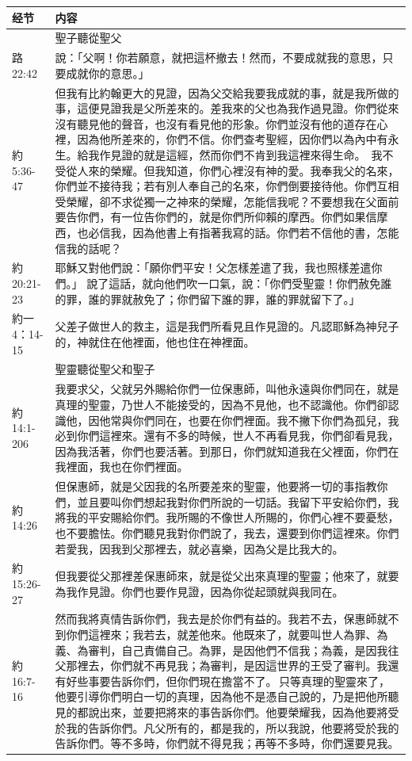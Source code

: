 \begin{table}[H]
\centering
\begin{tabular}{p{5.7em}p{43em}}  \toprule
经节&内容 \\  \midrule

&聖子聽從聖父\\  \midrule
路22:42&說：「父啊！你若願意，就把這杯撤去！然而，不要成就我的意思，只要成就你的意思。」\\  \midrule
約5:36-47&但我有比約翰更大的見證，因為父交給我要我成就的事，就是我所做的事，這便見證我是父所差來的。差我來的父也為我作過見證。你們從來沒有聽見他的聲音，也沒有看見他的形象。你們並沒有他的道存在心裡，因為他所差來的，你們不信。你們查考聖經，因你們以為內中有永生。給我作見證的就是這經，然而你們不肯到我這裡來得生命。  我不受從人來的榮耀。但我知道，你們心裡沒有神的愛。我奉我父的名來，你們並不接待我；若有別人奉自己的名來，你們倒要接待他。你們互相受榮耀，卻不求從獨一之神來的榮耀，怎能信我呢？不要想我在父面前要告你們，有一位告你們的，就是你們所仰賴的摩西。你們如果信摩西，也必信我，因為他書上有指著我寫的話。你們若不信他的書，怎能信我的話呢？\\  \midrule
約20:21-23&耶穌又對他們說：「願你們平安！父怎樣差遣了我，我也照樣差遣你們。」 說了這話，就向他們吹一口氣，說：「你們受聖靈！你們赦免誰的罪，誰的罪就赦免了；你們留下誰的罪，誰的罪就留下了。」\\  \midrule
約一4：14-15&父差子做世人的救主，這是我們所看見且作見證的。凡認耶穌為神兒子的，神就住在他裡面，他也住在神裡面。\\  \midrule

&聖靈聽從聖父和聖子\\  \midrule
約14:1-206&我要求父，父就另外賜給你們一位保惠師，叫他永遠與你們同在，就是真理的聖靈，乃世人不能接受的，因為不見他，也不認識他。你們卻認識他，因他常與你們同在，也要在你們裡面。我不撇下你們為孤兒，我必到你們這裡來。還有不多的時候，世人不再看見我，你們卻看見我，因為我活著，你們也要活著。到那日，你們就知道我在父裡面，你們在我裡面，我也在你們裡面。\\  \midrule
約14:26&但保惠師，就是父因我的名所要差來的聖靈，他要將一切的事指教你們，並且要叫你們想起我對你們所說的一切話。我留下平安給你們，我將我的平安賜給你們。我所賜的不像世人所賜的，你們心裡不要憂愁，也不要膽怯。你們聽見我對你們說了，我去，還要到你們這裡來。你們若愛我，因我到父那裡去，就必喜樂，因為父是比我大的。\\  \midrule
約15:26-27&但我要從父那裡差保惠師來，就是從父出來真理的聖靈；他來了，就要為我作見證。你們也要作見證，因為你從起頭就與我同在。\\  \midrule
約16:7-16&然而我將真情告訴你們，我去是於你們有益的。我若不去，保惠師就不到你們這裡來；我若去，就差他來。他既來了，就要叫世人為罪、為義、為審判，自己責備自己。為罪，是因他們不信我；為義，是因我往父那裡去，你們就不再見我；為審判，是因這世界的王受了審判。我還有好些事要告訴你們，但你們現在擔當不了。 只等真理的聖靈來了，他要引導你們明白一切的真理，因為他不是憑自己說的，乃是把他所聽見的都說出來，並要把將來的事告訴你們。他要榮耀我，因為他要將受於我的告訴你們。凡父所有的，都是我的，所以我說，他要將受於我的告訴你們。等不多時，你們就不得見我；再等不多時，你們還要見我。\\ \bottomrule
\end{tabular}%
\end{table}

